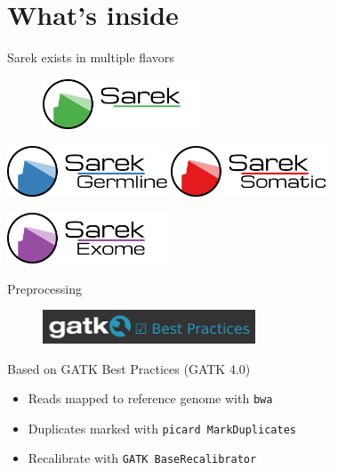 \documentclass[usepdftitle=false]{beamer}
\begin{document}
\section{What's inside}

\begin{frame}{Sarek exists in multiple flavors}
	\begin{figure}
		\includegraphics[height=1.5cm]{pictures/Sarek}
	\end{figure}
	\vfill
	\pause
	\begin{center}
		\includegraphics[height=1.5cm]{pictures/Sarek_germline}
		\hfill
		\pause
		\includegraphics[height=1.5cm]{pictures/Sarek_somatic}
	\end{center}
	\pause
	\begin{center}
		\includegraphics[height=1.5cm]{pictures/Sarek_exome}
	\end{center}
	\end{frame}

\begin{frame}{Preprocessing}
	\begin{figure}
		\includegraphics[height=1cm]{pictures/GATKBP}
	\end{figure}
	Based on GATK Best Practices (GATK 4.0)

	\pause

	\begin{itemize}
		\item Reads mapped to reference genome with \texttt{bwa}
		\pause
		\item Duplicates marked with \texttt{picard MarkDuplicates}
		\pause
		\item Recalibrate with \texttt{GATK BaseRecalibrator}
	\end{itemize}

\end{frame}
\end{document}
